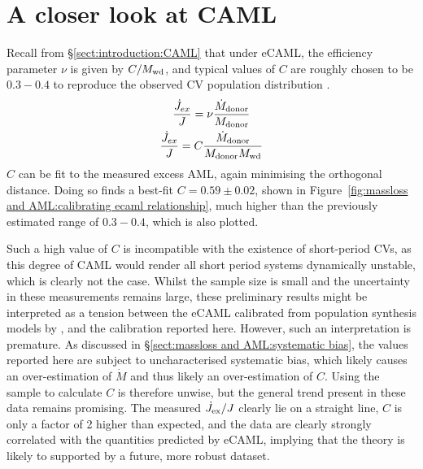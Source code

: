 \section{A closer look at CAML}
Recall from \S\ref{sect:introduction:CAML} that under eCAML, the efficiency parameter $\nu$ is given by $C/M_{\rm wd}$, and typical values of $C$ are roughly chosen to be $0.3 - 0.4$ to reproduce the observed CV population distribution \citep{Schreiber2016}.
\begin{gather}
    \frac{\dot J_{ex}}{J} = \nu \frac{\dot M_{\rm donor}}{M_{\rm donor}} \label{eqn:caml general} \\
    \frac{\dot J_{ex}}{J} = C \frac{\dot M_{\rm donor}}{M_{\rm donor} M_{\rm wd}} \label{eqn:ecaml}
\end{gather}
$C$ can be fit to the measured excess AML, again minimising the orthogonal distance.
Doing so finds a best-fit $C = 0.59\pm0.02$, shown in Figure~\ref{fig:massloss and AML:calibrating ecaml relationship}, much higher than the previously estimated range of $0.3 - 0.4$, which is also plotted.

Such a high value of $C$ is incompatible with the existence of short-period CVs, as this degree of CAML would render all short period systems dynamically unstable, which is clearly not the case. Whilst the sample size is small and the uncertainty in these measurements remains large, these preliminary results might be interpreted as a tension between the eCAML calibrated from population synthesis models by \citet{Schreiber2016}, and the calibration reported here.
However, such an interpretation is premature. As discussed in \S\ref{sect:massloss and AML:systematic bias}, the values reported here are subject to uncharacterised systematic bias, which likely causes an over-estimation of $\dot M$ and thus likely an over-estimation of $C$. Using the sample to calculate $C$ is therefore unwise, but the general trend present in these data remains promising. The measured $\dot J_{\rm ex} / J$ clearly lie on a straight line, $C$ is only a factor of 2 higher than expected, and the data are clearly strongly correlated with the quantities predicted by eCAML, implying that the theory is likely to supported by a future, more robust dataset.


